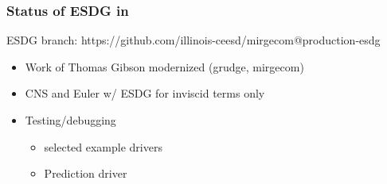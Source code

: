 \begin{frame}\frametitle{Status of ESDG in \mirgecom{}}
\vspace{15pt}
\begin{center}
\mirgecom{} ESDG branch: https://github.com/illinois-ceesd/mirgecom@production-esdg
\end{center}
\begin{itemize}
\item Work of Thomas Gibson modernized (grudge, mirgecom)
\item CNS and Euler w/ ESDG for inviscid terms only
\item Testing/debugging
\begin{itemize}
\item selected \mirgecom{} example drivers
\item Prediction driver
\end{itemize}
\end{itemize}
\end{frame}

